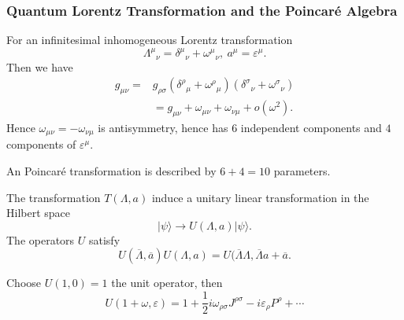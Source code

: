 \subsubsection{Quantum Lorentz Transformation and the Poincaré Algebra}

    For an infinitesimal inhomogeneous Lorentz transformation
            $${\Lambda^\mu}_\nu = {\delta^\mu}_\nu + {\omega^\mu}_\nu,\ a^\mu = \varepsilon^\mu.$$
Then we have
        \begin{align*}
            g_{\mu \nu} = 
                &g_{\rho \sigma} ({\delta^\rho}_\mu + {\omega^\rho}_\mu)({\delta^\sigma}_\nu + {\omega^\sigma}_\nu)\\
                &= g_{\mu \nu} +\omega_{\mu \nu} + \omega_{\nu \mu} + o(\omega^2).
        \end{align*}
Hence $\omega_{\mu \nu} = - \omega_{\nu \mu}$ is antisymmetry, hence has $6$ independent components and $4$ components of $\varepsilon^\mu$.

    \qquad An Poincaré transformation is described by $6+4=10$ parameters.

    \qquad The transformation $T(\Lambda, a)$ induce a unitary linear transformation in the Hilbert space
            $$|\psi \rangle \rightarrow U(\Lambda, a) |\psi \rangle.$$
    The operators $U$ satisfy
            $$U(\overline{\Lambda}, \overline{a}) U(\Lambda, a) = U(\overline{\Lambda} \Lambda, \overline{\Lambda}a + \overline{a}.$$

    \qquad Choose $U(1, 0) = 1$ the unit operator, then
        $$ U(1+\omega, \varepsilon) = 1+ \frac{1}{2} i \omega_{\rho \sigma} J^{\rho \sigma} - i \varepsilon_\rho P^\rho + \cdots$$




